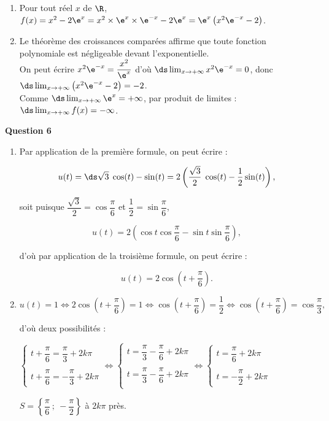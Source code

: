 \medskip

\begin{enumerate}
\item Pour tout réel $x$ de $\R$, $f(x)= x^2 - 2\e^{x} = x^2\times \e^{x} \times \e^{-x}- 2\e^{x} = \e^{x}\left(x^2\e^{-x} - 2\right)$.

\item Le théorème des croissances comparées affirme que toute fonction polynomiale est négligeable devant l'exponentielle.\\On peut écrire $x^2\e^{-x} = \dfrac{x^2}{\e^x}$ d'où $\ds\lim_{x\to +\infty} x^2\e^{-x} = 0$, donc $\ds\lim_{x\to +\infty} \left(x^2\e^{-x} - 2\right) = -2 $.\\Comme $\ds\lim_{x\to +\infty} \e^{x} = + \infty$, par produit de limites : $\ds\lim_{x\to +\infty} f(x) = - \infty$.
\end{enumerate}

\bigskip

\textbf{Question 6}

\medskip

\begin{enumerate}
\item Par application de la première formule, on peut écrire :

\[u(t)= \ds\sqrt{3}\;\cos (t) - \sin (t) = 2\left(\dfrac{\sqrt{3}}{2}\;\cos (t) - \dfrac12\sin (t)\right),\]

soit puisque $\dfrac{\sqrt{3}}{2} = \cos \dfrac{\pi}{6}$ et $\dfrac{1}{2} = \sin \dfrac{\pi}{6}$,

\[u(t) = 2\left(\cos t \cos \dfrac{\pi}{6} - \sin t \sin \dfrac{\pi}{6} \right),\]

d'où par application de la troisième formule, on peut écrire :

\[u(t) = 2\cos \left(t + \dfrac{\pi}{6} \right).\]

\item $u(t)=1 \iff 2\cos \left(t + \dfrac{\pi}{6} \right) = 1 \iff \cos \left(t + \dfrac{\pi}{6} \right) = \dfrac 12 \iff \cos \left(t + \dfrac{\pi}{6} \right) = \cos \dfrac{\pi}{3},$

d'où deux possibilités :

$\left\{\begin{array}{l}
t + \dfrac{\pi}{6} = \dfrac{\pi}{3} + 2k \pi \\
\\
t + \dfrac{\pi}{6} = -\dfrac{\pi}{3} + 2k \pi
\end{array}\right. \iff \left\{\begin{array}{l}
t = \dfrac{\pi}{3} - \dfrac{\pi}{6} + 2k\pi \\
\\
t = \dfrac{\pi}{3} - \dfrac{\pi}{6} + 2k\pi \\
\end{array}\right. \iff
\left\{\begin{array}{l}
t = \dfrac{\pi}{6} + 2k\pi\\
\\
t = -\dfrac{\pi}{2} + 2k\pi
\end{array}\right.$

$S = \left\{\dfrac{\pi}{6}~;~-\dfrac{\pi}{2} \right\}$ à $2k\pi$ près.
\end{enumerate}

\bigskip
